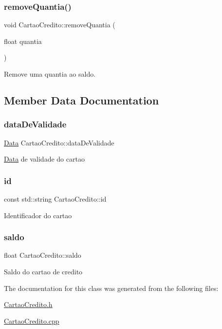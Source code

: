 \subsubsection{\texorpdfstring{remove\+Quantia()}{removeQuantia()}}
{\footnotesize\ttfamily void Cartao\+Credito\+::remove\+Quantia (\begin{DoxyParamCaption}\item[{float}]{quantia }\end{DoxyParamCaption})}



Remove uma quantia ao saldo. 



\subsection{Member Data Documentation}
\mbox{\label{class_cartao_credito_ae042cd5a71b48cad207b8975590a774f}} 
\subsubsection{\texorpdfstring{data\+De\+Validade}{dataDeValidade}}
{\footnotesize\ttfamily \mbox{\hyperlink{class_data}{Data}} Cartao\+Credito\+::data\+De\+Validade\hspace{0.3cm}{\ttfamily [private]}}

\mbox{\hyperlink{class_data}{Data}} de validade do cartao \mbox{\label{class_cartao_credito_a4f75c1aed80dc6b2240c7b8e008e5a19}} 
\subsubsection{\texorpdfstring{id}{id}}
{\footnotesize\ttfamily const std\+::string Cartao\+Credito\+::id\hspace{0.3cm}{\ttfamily [private]}}

Identificador do cartao \mbox{\label{class_cartao_credito_a2c674ee17ab52017618bf5e3ef9dd3cd}} 
\subsubsection{\texorpdfstring{saldo}{saldo}}
{\footnotesize\ttfamily float Cartao\+Credito\+::saldo\hspace{0.3cm}{\ttfamily [private]}}

Saldo do cartao de credito 

The documentation for this class was generated from the following files\+:\begin{DoxyCompactItemize}
\item 
\mbox{\hyperlink{_cartao_credito_8h}{Cartao\+Credito.\+h}}\item 
\mbox{\hyperlink{_cartao_credito_8cpp}{Cartao\+Credito.\+cpp}}\end{DoxyCompactItemize}

